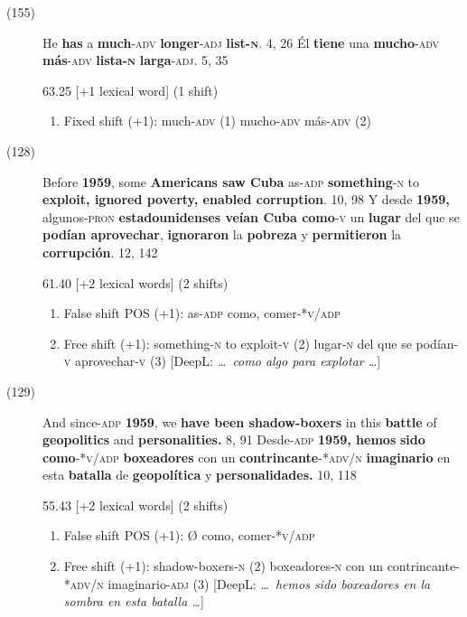 \documentclass[output=paper]{langsci/langscibook}
\begin{document}
\begin{description}
  \item[(155)] He \textbf{has} a \textbf{much}\textsc{-adv} \textbf{longer}\textsc{-adj} \textbf{list}\textbf{\textsc{-n}}. 4, 26 \rightarrow Él \textbf{tiene} una \textbf{mucho}\textsc{-adv} \textbf{más}\textsc{-adv} \textbf{lista}\textbf{\textsc{-n}} \textbf{larga}\textsc{-adj}. 5, 35

    63.25 [+1 lexical word] (1 shift)

    \begin{enumerate}
      \item Fixed shift (+1): much-\textsc{adv} (1) \rightarrow mucho-\textsc{adv} más-\textsc{adv} (2)
    \end{enumerate}

  \item[(128)] Before \textbf{1959}, some \textbf{Americans saw Cuba} as\textsc{-adp} \textbf{something}\textsc{-n} to \textbf{exploit, ignored poverty, enabled corruption}. 10, 98 \rightarrow Y desde \textbf{1959,} algunos\textsc{-pron} \textbf{estadounidenses veían Cuba como}\textsc{-v} un \textbf{lugar} del que se \textbf{podían aprovechar}, \textbf{ignoraron} la \textbf{pobreza} y \textbf{permitieron} la \textbf{corrupción}. 12, 142

    61.40 [+2 lexical words] (2 shifts)

    \begin{enumerate}
      \item False shift POS (+1): as-\textsc{adp} \rightarrow como, comer-*\textsc{v/adp}
      \item Free shift (+1): something-\textsc{n} to exploit-\textsc{v} (2) \rightarrow lugar-\textsc{n} del que se podían-\textsc{v} aprovechar-\textsc{v} (3) [DeepL: \textit{\dots\ como algo para explotar \dots}]
    \end{enumerate}

  \item[(129)] And since\textsc{-adp} \textbf{1959}, we \textbf{have been shadow-boxers} in this \textbf{battle} of \textbf{geopolitics} and \textbf{personalities.} 8, 91 \rightarrow Desde\textsc{-adp} \textbf{1959, hemos} \textbf{sido como}\textsc{-*v/adp} \textbf{boxeadores} con un \textbf{con\-trin\-can\-te}-*\textsc{adv/n} \textbf{imaginario} en esta \textbf{batalla} de \textbf{geopolítica} y \textbf{personalidades.} 10, 118

    55.43 [+2 lexical words] (2 shifts)

    \begin{enumerate}
      \item False shift POS (+1): Ø \rightarrow como, comer-*\textsc{v/adp}
      \item Free shift (+1): shadow-boxers-\textsc{n} (2) \rightarrow boxeadores-\textsc{n} con un contrincante-*\textsc{adv/n} imaginario-\textsc{adj} (3) [DeepL: \textit{\dots\ hemos sido boxeadores en la sombra en esta batalla \dots}]
    \end{enumerate}


\end{description}
\end{document}
